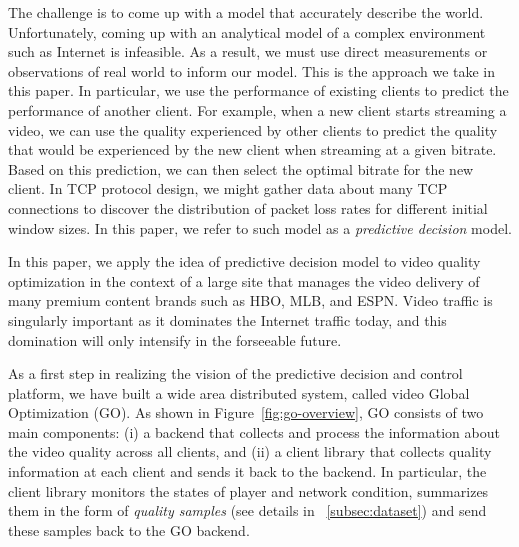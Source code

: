 The challenge is to come up with a model that accurately describe the
world. Unfortunately, coming up with an analytical model of a complex
environment such as Internet is infeasible. As a result, we must use
direct measurements or observations of real world to inform our
model. This is the approach we take in this paper. In particular, we
use the performance of existing clients to predict the performance of
another client. For example, when a new client starts streaming a
video, we can use the quality experienced by other clients to predict
the quality that would be experienced by the new client when streaming
at a given bitrate. Based on this prediction, we can then select the
optimal bitrate for the new client.  In TCP protocol design, we might
gather data about many TCP connections to discover the distribution of
packet loss rates for different initial window sizes.  
In this paper, we refer to such model as a {\it predictive decision} model.



\label{subsec:gooverview}

In this paper, we apply the idea of predictive decision model to video
quality optimization in the context of a large site that manages the
video delivery of many premium content brands such as HBO, MLB, and
ESPN. Video traffic is singularly important as it dominates the
Internet traffic today, and this domination will only intensify in the
forseeable future.

As a first step in realizing the vision of the predictive decision and control 
platform, we have built a wide area distributed system, called video Global 
Optimization (GO). As shown in
Figure~\ref{fig:go-overview}, GO consists of two main components: (i)
a backend that collects and process the information about the video
quality across all clients, and (ii) a client library that collects
quality information at each client and sends it back to the backend. In
particular, the client library monitors the states of player and
network condition, summarizes them in the form of \emph{quality
  samples} (see details in \Section~\ref{subsec:dataset}) and send
these samples back to the GO backend.

